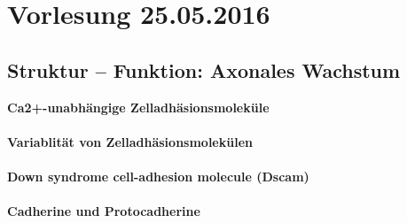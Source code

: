 \section{Vorlesung 25.05.2016}

\subsection{Struktur -- Funktion: Axonales Wachstum}

\textbf{Ca2+-unabhängige Zelladhäsionsmoleküle}
\\\\
\textbf{Variablität von Zelladhäsionsmolekülen}
\\\\
\textbf{Down syndrome cell-adhesion molecule (Dscam)}
\\\\
\textbf{Cadherine und Protocadherine}